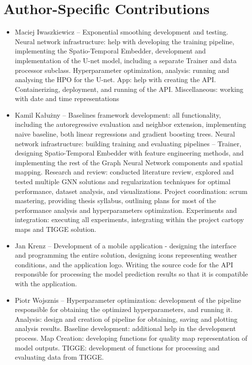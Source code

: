 \section{Author-Specific Contributions}
\begin{itemize}
    \item Maciej Iwaszkiewicz -- Exponential smoothing development and testing. Neural network infrastructure: help with developing the training pipeline, implementing the Spatio-Temporal Embedder, development and implementation of the U-net model, including a separate Trainer and data processor subclass. Hyperparameter optimization, analysis: running and analysing the HPO for the U-net. App: help with creating the API. Containerizing, deployment, and running of the API. Miscellaneous: working with date and time representations
    \item Kamil Kałużny -- Baselines framework development: all functionality, including the autoregressive evaluation and neighbor extension, implementing naive baseline, both linear regressions and gradient boosting trees. Neural network infrastructure: building training and evaluating pipelines -- Trainer, designing Spatio-Temporal Embedder with feature engineering methods, and implementing the rest of the Graph Neural Network components and spatial mapping. Research and review: conducted literature review, explored and tested multiple GNN solutions and regularization techniques for optimal performance, dataset analysis, and visualizations. Project coordination: scrum mastering, providing thesis syllabus, outlining plans for most of the performance analysis and hyperparameters optimization. Experiments and integration: executing all experiments, integrating within the project cartopy maps and TIGGE solution.
    \item Jan Krenz -- Development of a mobile application - designing the interface and programming the entire solution, designing icons representing weather conditions, and the application logo. Writing the source code for the API responsible for processing the model prediction results so that it is compatible with the application.
    \item Piotr Wojsznis -- Hyperparameter optimization: development of the pipeline responsible for obtaining the optimized hyperparameters, and running it.  Analysis: design and creation of pipeline for obtaining, saving and plotting analysis results. Baseline development: additional help in the development process. Map Creation: developing functions for quality map representation of model outputs. TIGGE: development of functions for processing and evaluating data from TIGGE.
\end{itemize}

